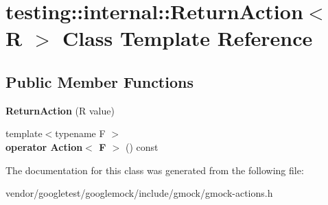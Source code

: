\hypertarget{classtesting_1_1internal_1_1ReturnAction}{}\section{testing\+:\+:internal\+:\+:Return\+Action$<$ R $>$ Class Template Reference}
\label{classtesting_1_1internal_1_1ReturnAction}
\subsection*{Public Member Functions}
\begin{DoxyCompactItemize}
\item 
{\bfseries Return\+Action} (R value)\hypertarget{classtesting_1_1internal_1_1ReturnAction_af65344e503dae3ab36b4fd6d1ede6fb7}{}\label{classtesting_1_1internal_1_1ReturnAction_af65344e503dae3ab36b4fd6d1ede6fb7}

\item 
{\footnotesize template$<$typename F $>$ }\\{\bfseries operator Action$<$ F $>$} () const \hypertarget{classtesting_1_1internal_1_1ReturnAction_a321155ed26bb50aea20d26f8603fb2ae}{}\label{classtesting_1_1internal_1_1ReturnAction_a321155ed26bb50aea20d26f8603fb2ae}

\end{DoxyCompactItemize}


The documentation for this class was generated from the following file\+:\begin{DoxyCompactItemize}
\item 
vendor/googletest/googlemock/include/gmock/gmock-\/actions.\+h\end{DoxyCompactItemize}
